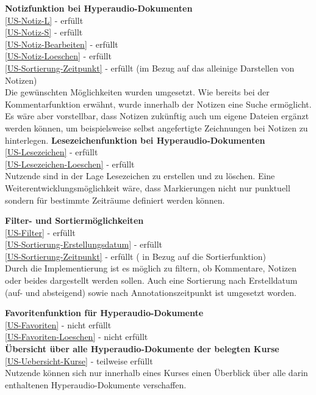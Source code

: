 \textbf{Notizfunktion bei Hyperaudio-Dokumenten}\\
\ref{US-Notiz-L} - erfüllt\\
\ref{US-Notiz-S} - erfüllt\\
\ref{US-Notiz-Bearbeiten} - erfüllt\\
\ref{US-Notiz-Loeschen} - erfüllt\\
\ref{US-Sortierung-Zeitpunkt} - erfüllt (im Bezug auf das alleinige Darstellen von Notizen)\\
Die gewünschten Möglichkeiten wurden umgesetzt. Wie bereits bei der Kommentarfunktion erwähnt, wurde innerhalb der Notizen eine Suche ermöglicht. Es wäre aber vorstellbar, dass Notizen zukünftig auch um eigene Dateien ergänzt werden können, um beispielsweise selbst angefertigte Zeichnungen bei Notizen zu hinterlegen. 
\textbf{Lesezeichenfunktion bei Hyperaudio-Dokumenten}\\
\ref{US-Lesezeichen} - erfüllt\\
\ref{US-Lesezeichen-Loeschen} - erfüllt\\
Nutzende sind in der Lage Lesezeichen zu erstellen und zu löschen. Eine Weiterentwicklungsmöglichkeit wäre, dass Markierungen nicht nur punktuell sondern für bestimmte Zeiträume definiert werden können.

\textbf{Filter- und Sortiermöglichkeiten}\\
\ref{US-Filter} - erfüllt\\
\ref{US-Sortierung-Erstellungsdatum} - erfüllt\\
\ref{US-Sortierung-Zeitpunkt} - erfüllt ( in Bezug auf die Sortierfunktion)\\
Durch die Implementierung ist es möglich zu filtern, ob Kommentare, Notizen oder beides dargestellt werden sollen. Auch eine Sortierung nach Erstelldatum (auf- und absteigend) sowie nach Annotationszeitpunkt ist umgesetzt worden.

\textbf{Favoritenfunktion für Hyperaudio-Dokumente}\\
\ref{US-Favoriten} - nicht erfüllt\\
\ref{US-Favoriten-Loeschen} - nicht erfüllt\\

\textbf{Übersicht über alle Hyperaudio-Dokumente der belegten Kurse}\\
\ref{US-Uebersicht-Kurse} - teilweise erfüllt\\
Nutzende können sich nur innerhalb eines Kurses einen Überblick über alle darin enthaltenen Hyperaudio-Dokumente verschaffen.


